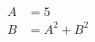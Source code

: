 \documentclass[preview]{standalone}
\begin{document}
\begin{align*}
	A &= 5 \\
	B &= A^2 + B^2
\end{align*}
\end{document}
